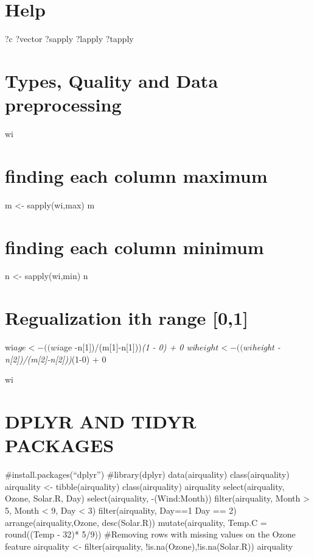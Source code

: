 \documentclass[
]{article}
\begin{document}
\section{Help}\label{help}

?c ?vector ?sapply ?lapply ?tapply

\section{Types, Quality and Data
preprocessing}\label{types-quality-and-data-preprocessing}

wi

\section{finding each column maximum}\label{finding-each-column-maximum}

m \textless- sapply(wi,max) m

\section{finding each column minimum}\label{finding-each-column-minimum}

n \textless- sapply(wi,min) n

\section{Regualization ith range
{[}0,1{]}}\label{regualization-ith-range-01}

wi\(age <- ( (wi\)age -n{[}1{]})/(m{[}1{]}-n{[}1{]}))\emph{(1 - 0) + 0
wi\(height <- ( (wi\)height -n{[}2{]})/(m{[}2{]}-n{[}2{]}))}(1-0) + 0

wi

\section{DPLYR AND TIDYR PACKAGES}\label{dplyr-and-tidyr-packages}

\#install.packages(``dplyr'') \#library(dplyr) data(airquality)
class(airquality) airquality \textless- tibble(airquality)
class(airquality) airquality select(airquality, Ozone, Solar.R, Day)
select(airquality, -(Wind:Month)) filter(airquality, Month
\textgreater{} 5, Month \textless{} 9, Day \textless{} 3)
filter(airquality, Day==1 \textbar{} Day == 2) arrange(airquality,Ozone,
desc(Solar.R)) mutate(airquality, Temp.C = round((Temp - 32)* 5/9))
\#Removing rows with missing values on the Ozone feature airquality
\textless- filter(airquality, !is.na(Ozone),!is.na(Solar.R)) airquality
\end{document}
